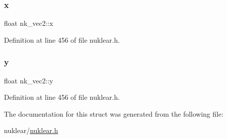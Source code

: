 \subsubsection{\texorpdfstring{x}{x}}
{\footnotesize\ttfamily float nk\+\_\+vec2\+::x}



Definition at line 456 of file nuklear.\+h.

\mbox{\label{structnk__vec2_af9ce34510fcf72827a980f5d92d78f1c}} 
\subsubsection{\texorpdfstring{y}{y}}
{\footnotesize\ttfamily float nk\+\_\+vec2\+::y}



Definition at line 456 of file nuklear.\+h.



The documentation for this struct was generated from the following file\+:\begin{DoxyCompactItemize}
\item 
nuklear/\mbox{\hyperlink{nuklear_8h}{nuklear.\+h}}\end{DoxyCompactItemize}

